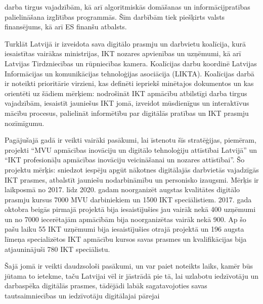 darba tirgus vajadzībām, kā arī algoritmiskās domāšanas un informācijpratības palielināšana
izglītības programmās. Šīm darbībām tiek piešķirts valsts finansējums, kā arī ES finanšu
atbalsts.
\par
Turklāt Latvijā ir izveidota sava digitālo prasmju un darbvietu koalīcija, kurā iesaistītas
vairākas ministrijas, IKT nozares apvienības un uzņēmumi, kā arī Latvijas Tirdzniecības un
rūpniecības kamera. Koalīcijas darbu koordinē Latvijas Informācijas un komunikācijas
tehnoloģijas asociācija (LIKTA). Koalīcijas darbā ir noteikti prioritārie virzieni, kas definēti
iepriekš minētajos dokumentos un kas orientēti uz šādiem mērķiem: nodrošināt IKT
apmācību atbilstīgi darba tirgus vajadzībām, iesaistīt jauniešus IKT jomā, izveidot
mūsdienīgus un interaktīvus mācību procesus, palielināt informētību par digitālās pratības un
IKT prasmju nozīmīgumu.
\par
Pagājušajā gadā ir veikti vairāki pasākumi, lai īstenotu šīs stratēģijas, piemēram, projekti
“MVU apmācības inovāciju un digitālo tehnoloģiju attīstībai Latvijā” un “IKT profesionāļu
apmācības inovāciju veicināšanai un nozares attīstībai”. Šo projektu mērķis: sniedzot
iespēju apgūt nākotnes digitālajās darbvietās vajadzīgās IKT prasmes, atbalstīt jauniešu
nodarbināmību un personisko izaugsmi. Mērķis ir laikposmā no 2017. līdz 2020. gadam
noorganizēt augstas kvalitātes digitālo prasmju kursus 7000 MVU darbiniekiem un 1500 IKT
speciālistiem. 2017. gada oktobra beigās pirmajā projektā bija iesaistījušies jau vairāk nekā
400 uzņēmumi un no 7000 iecerētajām apmācībām bija noorganizētas vairāk nekā 900. Ap
šo pašu laiku 55 IKT uzņēmumi bija iesaistījušies otrajā projektā un 196 augsta līmeņa
specializētos IKT apmācību kursos savas prasmes un kvalifikācijas bija atjauninājuši 780 IKT
speciālistu.
\par
Šajā jomā ir veikti daudzsološi pasākumi, un var paiet noteikts laiks, kamēr būs jūtama to
ietekme, taču Latvijai vēl ir jāstrādā pie tā, lai uzlabotu iedzīvotāju un darbaspēka digitālās
prasmes, tādējādi labāk sagatavojoties savas tautsaimniecības un iedzīvotāju digitālajai
pārejai